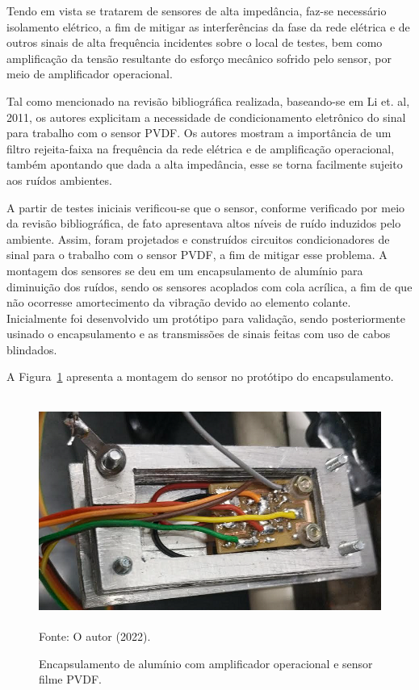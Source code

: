 \documentclass[
	12pt,				
	oneside,			
	a4paper,			
	english,			
	brazil,	
	sumario=abnt-6027-2012		
	]{abntex2ppgsi}
\begin{document}
Tendo em vista se tratarem de sensores de alta impedância, faz-se necessário isolamento elétrico, a fim de mitigar as interferências da fase da rede elétrica e de outros sinais de alta frequência incidentes sobre o local de testes, bem como amplificação da tensão resultante do esforço mecânico sofrido pelo sensor, por meio de amplificador operacional. 

Tal como mencionado na revisão bibliográfica realizada, baseando-se em Li et. al, 2011, os autores explicitam a necessidade de condicionamento eletrônico do sinal para trabalho com o sensor PVDF. Os autores mostram a importância de um filtro rejeita-faixa na frequência da rede elétrica e de amplificação operacional, também apontando que dada a alta impedância, esse se torna facilmente sujeito aos ruídos ambientes. 

A partir de testes iniciais verificou-se que o sensor, conforme verificado por meio da revisão bibliográfica, de fato apresentava altos níveis de ruído induzidos pelo ambiente. Assim, foram projetados e construídos circuitos condicionadores de sinal para o trabalho com o sensor PVDF, a fim de mitigar esse problema. A montagem dos sensores se deu em um encapsulamento de alumínio para diminuição dos ruídos, sendo os sensores acoplados com cola acrílica, a fim de que não ocorresse amortecimento da vibração devido ao elemento colante. Inicialmente foi desenvolvido um protótipo para validação, sendo posteriormente usinado o encapsulamento e as transmissões de sinais feitas com uso de cabos blindados. 

A Figura~\ref{encapsulamento_sensor} apresenta a montagem do sensor no protótipo do encapsulamento.

\begin{figure}[H]
\centering
\caption {Encapsulamento de alumínio com amplificador operacional e sensor filme PVDF.}
\includegraphics[width=\textwidth,height=75mm,keepaspectratio]{encapsulamento_sensor} \\
Fonte: O autor (2022).
\label{encapsulamento_sensor}
\end{figure} 
\end{document}
